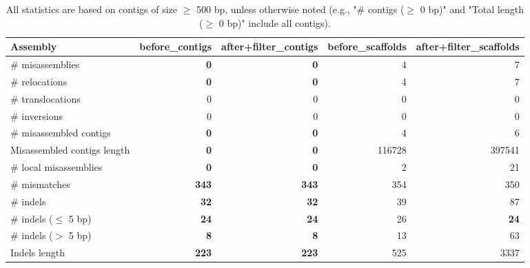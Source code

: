 \documentclass[12pt,a4paper]{article}
\begin{document}
\begin{table}[ht]
\begin{center}
\caption{All statistics are based on contigs of size $\geq$ 500 bp, unless otherwise noted (e.g., "\# contigs ($\geq$ 0 bp)" and "Total length ($\geq$ 0 bp)" include all contigs).}
\begin{tabular}{|l*{4}{|r}|}
\hline
Assembly & before\_contigs & after+filter\_contigs & before\_scaffolds & after+filter\_scaffolds \\ \hline
\# misassemblies & {\bf 0} & {\bf 0} & 4 & 7 \\ \hline
\hspace{5mm}\# relocations & {\bf 0} & {\bf 0} & 4 & 7 \\ \hline
\hspace{5mm}\# translocations & 0 & 0 & 0 & 0 \\ \hline
\hspace{5mm}\# inversions & 0 & 0 & 0 & 0 \\ \hline
\# misassembled contigs & {\bf 0} & {\bf 0} & 4 & 6 \\ \hline
Misassembled contigs length & {\bf 0} & {\bf 0} & 116728 & 397541 \\ \hline
\# local misassemblies & {\bf 0} & {\bf 0} & 2 & 21 \\ \hline
\# mismatches & {\bf 343} & {\bf 343} & 354 & 350 \\ \hline
\# indels & {\bf 32} & {\bf 32} & 39 & 87 \\ \hline
\hspace{5mm}\# indels ($\leq$ 5 bp) & {\bf 24} & {\bf 24} & 26 & {\bf 24} \\ \hline
\hspace{5mm}\# indels ($>$ 5 bp) & {\bf 8} & {\bf 8} & 13 & 63 \\ \hline
Indels length & {\bf 223} & {\bf 223} & 525 & 3337 \\ \hline
\end{tabular}
\end{center}
\end{table}
\end{document}
